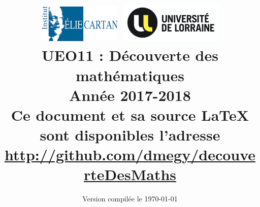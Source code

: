 \documentclass[11pt,a4paper]{book}
\theoremstyle{definition}
\theoremstyle{plain}
\begin{document}
\title{
\includegraphics[width=4cm]{logo-IECL}
\hfill
\includegraphics[width=5cm]{logo-UL}\\
\vspace{3em}
UEO11 : Découverte des mathématiques\\
Année 2017-2018\\
\vspace{3em}
{\small \faGithub{}  Ce document et sa source \LaTeX{} sont disponibles  l'adresse\\
\url{http://github.com/dmegy/decouverteDesMaths}}
}

\date{Version compilée le \today{}%
}


\maketitle

\tableofcontents


















\printindex
\end{document}
